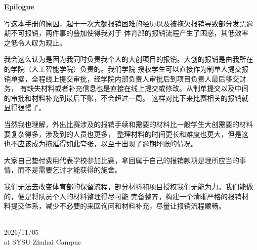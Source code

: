 \clearpage
{}\label{epilogue}
\vspace*{5mm}
{\sffamily\bfseries\color{BookBlue}\fontsize{26.25}{34}\selectfont\noindent Epilogue\par}
\vspace{20pt}
\fontsize{12}{23.4}\selectfont
\setlength{\parindent}{2\ccwd}

写这本手册的原因，起于一次大额报销困难的经历以及被拖欠报销导致部分发票逾期不可报销，两件事的叠加使得我对于
体育部的报销流程产生了困惑，其低效率之低令人叹为观止。

我会这么认为是因为我同时负责我个人的大创项目的报销。大创的报销是由我所在的学院（人工智能学院）负责的。我们学院
授权学生可以直接作为制单人提交报销单据，全程线上提交审批，经学院内部负责人审批后到项目负责人最后移交财务，
有缺失材料或者补充信息也是直接在线上提交或修改。从制单提交以及中间的审批和材料补充到最后下账，不会超过一周。
这样对比下来比赛相关的报销就显得很慢了。

当然我也理解，外出比赛涉及的报销手续和需要的材料比一般学生大创需要的材料要复杂得多，涉及到的人员也更多，
整理材料的时间更长和难度也更大，但是这也不应该成为拖延得如此夸张，以至于出现了逾期坏账的情况。

\begin{tcolorbox}[handbook,colback=white,borderline west={1.5pt}{0pt}{BookPurple},left=11pt,top=1pt,bottom=1pt,before skip=13pt,after skip=13pt,fontupper=\sffamily\bfseries\fontsize{11.75}{22}]
大家自己垫付费用代表学校参加比赛，拿回属于自己的报销款项是理所应当的事情，而不是需要乞讨才能获得的施舍。
\end{tcolorbox}

我们无法去改变体育部的保留流程，部分材料和项目授权我们无能为力。我们能做的，便是将队员个人的材料整理得尽可能
完备整齐，构建一个清晰严格的报销材料提交体系，减少不必要的来回询问和材料补充，尽量让报销流程顺畅。

\vspace{6pt}\begin{flushright}\fontsize{10.5}{18}\selectfont
{}\\
2026/11/05\\
at SYSU Zhuhai Campus
\end{flushright}
